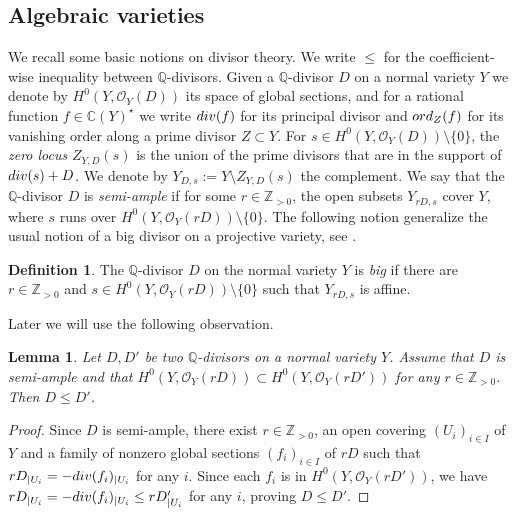 \documentclass[11pt, reqno]{amsart}
\theoremstyle{plain}
\newtheorem{lemma}[theorem]{Lemma}
\theoremstyle{definition}
\newtheorem{definition}[theorem]{Definition}
\theoremstyle{remark}
\begin{document}
\subsection{Algebraic varieties}
We recall some basic notions on divisor theory.
We write $\leq$ for the coefficient-wise inequality between $\mathbb{Q}$-divisors. Given a $\mathbb{Q}$-divisor $D$ on  a normal variety $Y$ we denote by $H^{0}(Y, \mathcal{O}_{Y}(D))$ its space of global sections, and for a rational function $f\in \mathbb{C}(Y)^{\star}$ we write ${\rm div}(f)$ for its principal divisor and ${\rm ord}_{Z}(f)$ for its vanishing order along a prime divisor $Z\subset Y$. For $s\in H^{0}(Y, \mathcal{O}_{Y}(D))\setminus\{0\}$, the \emph{zero locus}  $Z_{Y, D}(s)$ is the union of the prime divisors that are in the support
of ${\rm div}(s) + D$. We denote by $Y_{D, s} :=  Y\setminus Z_{Y, D}(s)$ the complement. We say that 
the $\mathbb{Q}$-divisor $D$ is \emph{semi-ample} if for some $r\in \mathbb{Z}_{>0}$, the open subsets $Y_{rD, s}$ cover $Y$, where
$s$ runs over $H^{0}(Y, \mathcal{O}_{Y}(rD))\setminus\{0\}$.
The following notion generalize the usual notion of a big divisor on a projective variety, see \cite[Lemma 2.60]{KM98}.
\begin{definition}
The $\mathbb{Q}$-divisor $D$ on the normal variety $Y$ is \emph{big} if there are $r\in \mathbb{Z}_{>0}$  and $s\in H^{0}(Y, \mathcal{O}_{Y}(rD))\setminus\{0\}$ such that $Y_{rD, s}$ is affine. 
\end{definition}
Later we will use the following observation. 
\begin{lemma}\label{lem1-Qdivisor}
Let $D, D'$ be two $\mathbb{Q}$-divisors on a normal variety $Y$. Assume that $D$ is semi-ample and that $H^{0}(Y, \mathcal{O}_{Y}(rD))\subset H^{0}(Y, \mathcal{O}_{Y}(rD'))$ for any $r\in \mathbb{Z}_{>0}$. Then  $D\leq D'$. 
\end{lemma}
\begin{proof}
Since $D$ is semi-ample, there exist $r\in\mathbb{Z}_{>0}$,
an open covering $(U_{i})_{i\in I}$ of $Y$ and a family of nonzero global sections $(f_{i})_{i\in I}$ of $rD$ such that $rD_{|U_{i}} = -{\rm div}(f_{i})_{|U_{i}}$ for any $i$. Since each $f_{i}$ is in $H^{0}(Y, \mathcal{O}_{Y}(rD'))$, we have $rD_{|U_{i}} = -{\rm div}(f_{i})_{|U_{i}}\leq rD_{|U_{i}}'$ for any $i$, proving $D\leq D'$. 
\end{proof}
\end{document}
